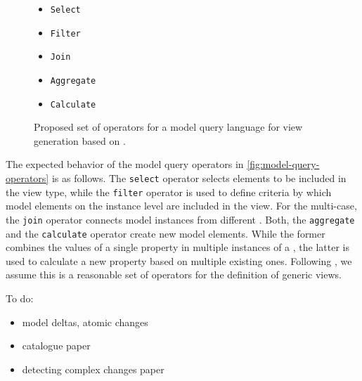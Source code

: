 \begin{figure}[h]
    \begin{itemize}
        \item \texttt{Select}
        \item \texttt{Filter}
        \item \texttt{Join}
        \item \texttt{Aggregate}
        \item \texttt{Calculate}
    \end{itemize}

    \caption{Proposed set of operators for a model query language for view generation based on \textcite{burger_model-join_2016}.}
    \label{fig:model-query-operators}
\end{figure}

The expected behavior of the model query operators in \autoref{fig:model-query-operators} is as follows.
The \texttt{select} operator selects \metamodel elements to be included in the view type, while the \texttt{filter} operator is used to define criteria by which model elements on the instance level are included in the view.
For the multi-\metamodel case, the \texttt{join} operator connects model instances from different \metamodels.
Both, the \texttt{aggregate} and the \texttt{calculate} operator create new model elements.
While the former combines the values of a single property in multiple instances of a \metaclass, the latter is used to calculate a new property based on multiple existing ones.
Following \textcite{burger_model-join_2016}, we assume this is a reasonable set of operators for the definition of generic views.


\vspace{2.5ex}
\noindent To do:
\begin{itemize}
    \item model deltas, atomic changes
    \item catalogue paper
    \item detecting complex changes paper
\end{itemize}
